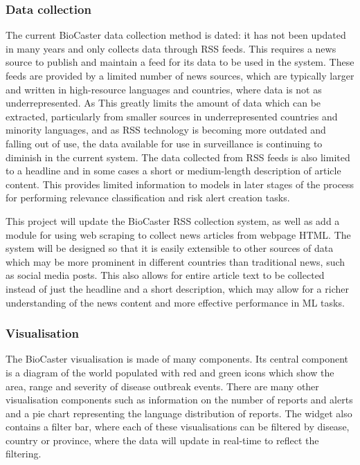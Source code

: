\documentclass{l4proj}
\begin{document}
\subsubsection{Data collection} \hfill \par
The current BioCaster data collection method is dated: it has not been updated in many years and only collects data through RSS feeds. This requires a news source to publish and maintain a feed for its data to be used in the system. These feeds are provided by a limited number of news sources, which are typically larger and written in high-resource languages and countries, where data is not as underrepresented. As  This greatly limits the amount of data which can be extracted, particularly from smaller sources in underrepresented countries and minority languages, and as RSS technology is becoming more outdated and falling out of use, the data available for use in surveillance is continuing to diminish in the current system. The data collected from RSS feeds is also limited to a headline and in some cases a short or medium-length description of article content. This provides limited information to models in later stages of the process for performing relevance classification and risk alert creation tasks. \par
This project will update the BioCaster RSS collection system, as well as add a module for using web scraping to collect news articles from webpage HTML. The system will be designed so that it is easily extensible to other sources of data which may be more prominent in different countries than traditional news, such as social media posts. This also allows for entire article text to be collected instead of just the headline and a short description, which may allow for a richer understanding of the news content and more effective performance in ML tasks.
\subsubsection{Visualisation} \hfill \par
The BioCaster visualisation is made of many components. Its central component is a diagram of the world populated with red and green icons which show the area, range and severity of disease outbreak events. There are many other visualisation components such as information on the number of reports and alerts and a pie chart representing the language distribution of reports. The widget also contains a filter bar, where each of these visualisations can be filtered by disease, country or province, where the data will update in real-time to reflect the filtering. 
\end{document}

